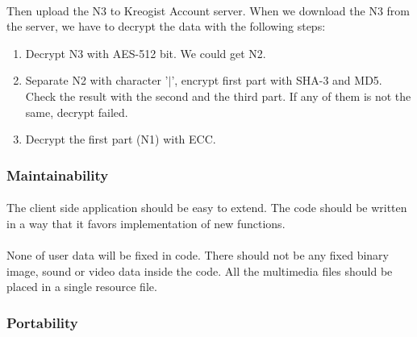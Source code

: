 \documentclass[11pt,a4paper]{article}
\begin{document}
				\paragraph{} Then upload the N3 to Kreogist Account server. When we download the N3 from the server, we have to decrypt the data with the following steps:
				\begin{enumerate}
					\item Decrypt N3 with AES-512 bit. We could get N2.
					\item Separate N2 with character '$|$', encrypt first part with SHA-3 and MD5. Check the result with the second and the third part. If any of them is not the same, decrypt failed.
					\item Decrypt the first part (N1) with ECC.
				\end{enumerate}
            \subsubsection{Maintainability}
            	\paragraph{} The client side application should be easy to extend. The code should be written in a way that it favors implementation of new functions.
				\paragraph{} None of user data will be fixed in code. There should not be any fixed binary image, sound or video data inside the code. All the multimedia files should be placed in a single resource file.
            \subsubsection{Portability}
\end{document}
